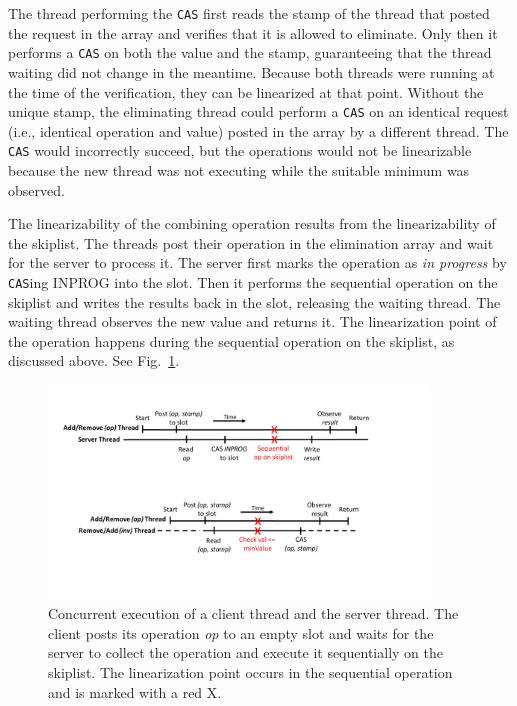 The thread performing the \texttt{CAS} first reads the stamp of the thread that posted the request in the array and verifies that it is allowed to eliminate. Only then it performs a \texttt{CAS} on both the value and the stamp, guaranteeing that the thread waiting did not change in the meantime. Because both threads were running at the time of the verification, they can be linearized at that point. Without the unique stamp, the eliminating thread could perform a \texttt{CAS} on an identical request (i.e., identical operation and value) posted in the array by a different thread. The \texttt{CAS} would incorrectly succeed, but the operations would not be linearizable because the new thread was not executing while the suitable minimum was observed.%

The linearizability of the combining operation results from the linearizability of the skiplist. The threads post their operation in the elimination array and wait for the server to process it. The server first marks the operation as \emph{in progress} by \texttt{CAS}ing INPROG into the slot. Then it performs the sequential operation on the skiplist and writes the results back in the slot, releasing the waiting thread. The waiting thread observes the new value and returns it. The linearization point of the operation happens during the sequential operation on the skiplist, as discussed above. See Fig.~\ref{fig:correctness_server}.

\begin{figure}[htb]
  \centering
  \includegraphics[width=0.9\textwidth]{img/correctness1.pdf}
\caption{Concurrent execution of a client thread and the server thread. The client posts its operation \emph{op} to an empty slot and waits for the server to collect the operation and execute it sequentially on the skiplist. The linearization point occurs in the sequential operation and is marked with a red X.}
\label{fig:correctness_server}
\end{figure}
